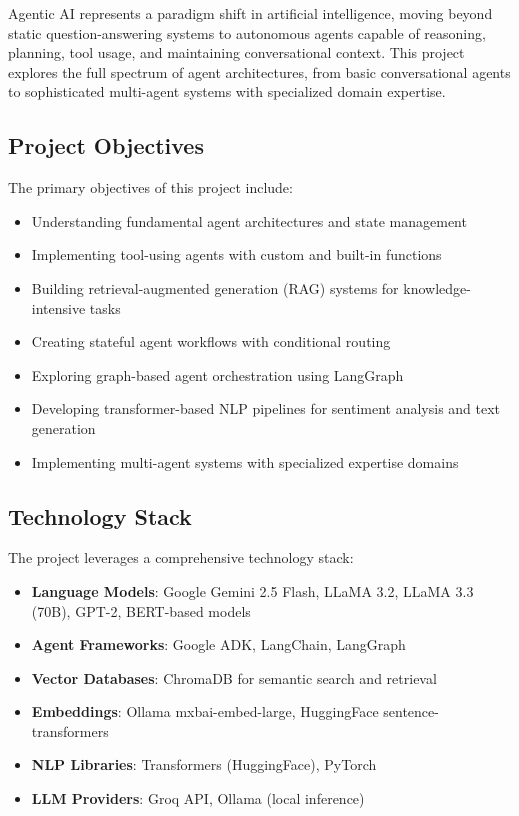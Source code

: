 \documentclass[12pt,a4paper]{article}
\begin{document}
Agentic AI represents a paradigm shift in artificial intelligence, moving beyond static question-answering systems to autonomous agents capable of reasoning, planning, tool usage, and maintaining conversational context. This project explores the full spectrum of agent architectures, from basic conversational agents to sophisticated multi-agent systems with specialized domain expertise.

\subsection{Project Objectives}

The primary objectives of this project include:
\begin{itemize}
    \item Understanding fundamental agent architectures and state management
    \item Implementing tool-using agents with custom and built-in functions
    \item Building retrieval-augmented generation (RAG) systems for knowledge-intensive tasks
    \item Creating stateful agent workflows with conditional routing
    \item Exploring graph-based agent orchestration using LangGraph
    \item Developing transformer-based NLP pipelines for sentiment analysis and text generation
    \item Implementing multi-agent systems with specialized expertise domains
\end{itemize}

\subsection{Technology Stack}

The project leverages a comprehensive technology stack:
\begin{itemize}
    \item \textbf{Language Models}: Google Gemini 2.5 Flash, LLaMA 3.2, LLaMA 3.3 (70B), GPT-2, BERT-based models
    \item \textbf{Agent Frameworks}: Google ADK, LangChain, LangGraph
    \item \textbf{Vector Databases}: ChromaDB for semantic search and retrieval
    \item \textbf{Embeddings}: Ollama mxbai-embed-large, HuggingFace sentence-transformers
    \item \textbf{NLP Libraries}: Transformers (HuggingFace), PyTorch
    \item \textbf{LLM Providers}: Groq API, Ollama (local inference)
\end{itemize}
\end{document}
